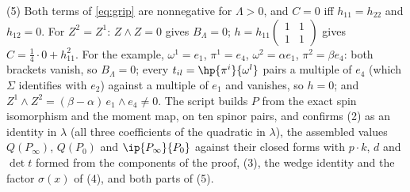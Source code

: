 (5) Both terms of \eqref{eq:grip} are nonnegative for $\Lambda > 0$, and $C = 0$ iff $h_{11} = h_{22}$ and $h_{12} = 0$. For $Z^{2} = Z^{1}$: $Z\wedge Z = 0$ gives $B_{\Lambda} = 0$; $h = h_{11}\left(\begin{smallmatrix}1&1\\1&1\end{smallmatrix}\right)$ gives $C = \tfrac14\cdot 0 + h_{11}^{2}$. For the example, $\omega^{1} = e_{1}$, $\pi^{1} = e_{4}$, $\omega^{2} = \alpha e_{1}$, $\pi^{2} = \beta e_{4}$: both brackets vanish, so $B_{\Lambda} = 0$; every $t_{il} = \hp{\pi^{i}}{\omega^{l}}$ pairs a multiple of $e_{4}$ (which $\Sigma$ identifies with $e_{2}$) against a multiple of $e_{1}$ and vanishes, so $h = 0$; and $Z^{1}\wedge Z^{2} = (\beta - \alpha)\,e_{1}\wedge e_{4} \neq 0$. The script builds $P$ from the exact spin isomorphism and the moment map, on ten spinor pairs, and confirms (2) as an identity in $\lambda$ (all three coefficients of the quadratic in $\lambda$), the assembled values $Q(P_{\infty})$, $Q(P_{0})$ and $\ip{P_{\infty}}{P_{0}}$ against their closed forms with $p\cdot k$, $d$ and $\det t$ formed from the components of the proof, (3), the wedge identity and the factor $\sigma(x)$ of (4), and both parts of (5).
